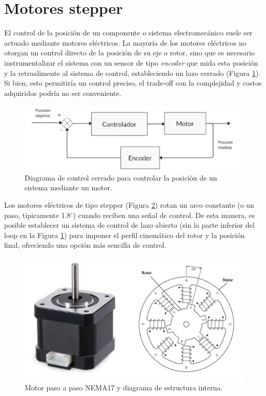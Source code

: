 \section{Motores stepper}

El control de la posición de un componente o sistema electromecánico suele ser actuado mediante motores eléctricos. La mayoría de los motores eléctricos no otorgan un control directo de la posición de su eje o rotor, sino que es necesario instrumentalizar el sistema con un sensor de tipo \textit{encoder} que mida esta posición y la retroalimente al sistema de control, estableciendo un lazo cerrado (Figura \ref{controlup}). Si bien, esto permitiría un control preciso, el trade-off con la complejidad y costos adquiridos podría no ser conveniente.

\begin{figure}[h!]
    \centering
    \includegraphics[width=0.9\linewidth]{imgs/controlup.png}
    \caption{Diagrama de control cerrado para controlar la posición de un sistema mediante un motor.}
    \label{controlup}
\end{figure}

Los motores eléctricos de tipo stepper (Figura \ref{stpi}) rotan un arco constante (o un paso, típicamente 1.8$^\circ$) cuando reciben una señal de control. De esta manera, es posible establecer un sistema de control de lazo abierto (sin la parte inferior del loop en la Figura \ref{controlup}) para imponer el perfil cinemático del rotor y la posición final, ofreciendo una opción más sencilla de control. 

\begin{figure}[h!]
    \centering
    \includegraphics[width=0.7\linewidth]{imgs/stps.png}
    \caption{Motor paso a paso NEMA17 y diagrama de estructura interna.}
    \label{stpi}
\end{figure}


